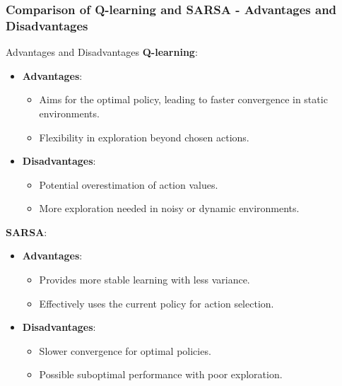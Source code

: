 \documentclass[aspectratio=169]{beamer}
\begin{document}
\begin{frame}[fragile]
    \frametitle{Comparison of Q-learning and SARSA - Advantages and Disadvantages}
    \begin{block}{Advantages and Disadvantages}
        \textbf{Q-learning}:
        \begin{itemize}
            \item \textbf{Advantages}:
            \begin{itemize}
                \item Aims for the optimal policy, leading to faster convergence in static environments.
                \item Flexibility in exploration beyond chosen actions.
            \end{itemize}
            \item \textbf{Disadvantages}:
            \begin{itemize}
                \item Potential overestimation of action values.
                \item More exploration needed in noisy or dynamic environments.
            \end{itemize}
        \end{itemize}
        
        \textbf{SARSA}:
        \begin{itemize}
            \item \textbf{Advantages}:
            \begin{itemize}
                \item Provides more stable learning with less variance.
                \item Effectively uses the current policy for action selection.
            \end{itemize}
            \item \textbf{Disadvantages}:
            \begin{itemize}
                \item Slower convergence for optimal policies.
                \item Possible suboptimal performance with poor exploration.
            \end{itemize}
        \end{itemize}
    \end{block}
\end{frame}
\end{document}
